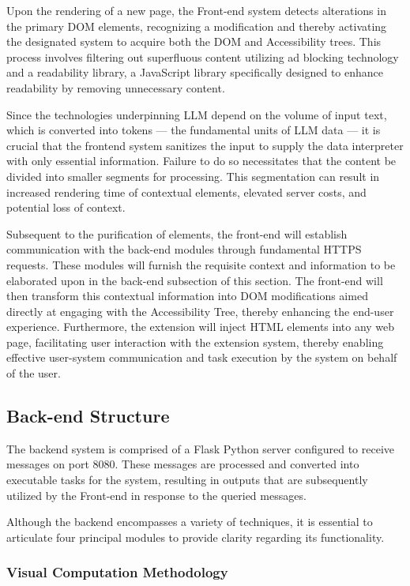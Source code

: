 \documentclass[conference]{IEEEtran}
\begin{document}
Upon the rendering of a new page, the Front-end system detects alterations in the primary DOM elements, recognizing a modification and thereby activating the designated system to acquire both the DOM and Accessibility trees. This process involves filtering out superfluous content utilizing ad blocking technology and a readability library, a JavaScript library specifically designed to enhance readability by removing unnecessary content.

Since the technologies underpinning LLM depend on the volume of input text, which is converted into tokens — the fundamental units of LLM data — it is crucial that the frontend system sanitizes the input to supply the data interpreter with only essential information. Failure to do so necessitates that the content be divided into smaller segments for processing. This segmentation can result in increased rendering time of contextual elements, elevated server costs, and potential loss of context.

Subsequent to the purification of elements, the front-end will establish communication with the back-end modules through fundamental HTTPS requests. These modules will furnish the requisite context and information to be elaborated upon in the back-end subsection of this section. The front-end will then transform this contextual information into DOM modifications aimed directly at engaging with the Accessibility Tree, thereby enhancing the end-user experience. Furthermore, the extension will inject HTML elements into any web page, facilitating user interaction with the extension system, thereby enabling effective user-system communication and task execution by the system on behalf of the user.

\subsection{Back-end Structure}

The backend system is comprised of a Flask Python server configured to receive messages on port 8080. These messages are processed and converted into executable tasks for the system, resulting in outputs that are subsequently utilized by the Front-end in response to the queried messages. 

Although the backend encompasses a variety of techniques, it is essential to articulate four principal modules to provide clarity regarding its functionality.

\subsubsection{Visual Computation Methodology}
\end{document}
